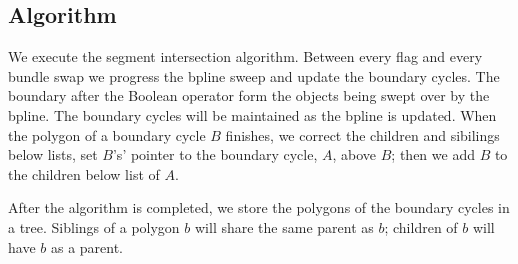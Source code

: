 \documentclass[11pt]{article}
\begin{document}
\subsection{Algorithm}
We execute the segment intersection algorithm.
Between every flag and every bundle swap we progress the bpline sweep and update the boundary cycles.
The boundary after the Boolean operator form the objects being swept over by the bpline.
The boundary cycles will be maintained as the bpline is updated.
When the polygon of a boundary cycle $B$ finishes, we correct the children and sibilings below lists, set $B$'s' pointer to the boundary cycle, $A$, above $B$; then we add $B$ to the children below list of $A$.

After the algorithm is completed, we store the polygons of the boundary cycles in a tree.
Siblings of a polygon $b$ will share the same parent as $b$; children of $b$ will have $b$ as a parent.
\end{document}
